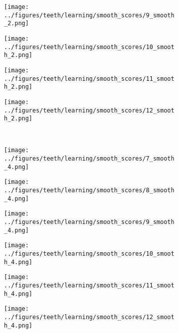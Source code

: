 \begin{figure}[h!]
	\begin{subfigure}{0.16\textwidth}
		\centering
		\texttt{[image: ../figures/teeth/learning/smooth\_scores/9\_smooth\_2.png]}
		\label{fig:1}
	\end{subfigure}
	\begin{subfigure}{0.16\textwidth}
		\centering
		\texttt{[image: ../figures/teeth/learning/smooth\_scores/10\_smooth\_2.png]}
		\label{fig:1}
	\end{subfigure}
	\begin{subfigure}{0.16\textwidth}
		\centering
		\texttt{[image: ../figures/teeth/learning/smooth\_scores/11\_smooth\_2.png]}
		\label{fig:1}
	\end{subfigure}
	\begin{subfigure}{0.16\textwidth}
		\centering
		\texttt{[image: ../figures/teeth/learning/smooth\_scores/12\_smooth\_2.png]}
		\label{fig:1}
	\end{subfigure}
	\vspace{-0.35cm}
	\\
	\begin{subfigure}{0.16\textwidth}
		\centering
		\texttt{[image: ../figures/teeth/learning/smooth\_scores/7\_smooth\_4.png]}
		\label{fig:1}
	\end{subfigure}
	\begin{subfigure}{0.16\textwidth}
		\centering
		\texttt{[image: ../figures/teeth/learning/smooth\_scores/8\_smooth\_4.png]}
		\label{fig:1}
	\end{subfigure}
	\begin{subfigure}{0.16\textwidth}
		\centering
		\texttt{[image: ../figures/teeth/learning/smooth\_scores/9\_smooth\_4.png]}
		\label{fig:1}
	\end{subfigure}
	\begin{subfigure}{0.16\textwidth}
		\centering
		\texttt{[image: ../figures/teeth/learning/smooth\_scores/10\_smooth\_4.png]}
		\label{fig:1}
	\end{subfigure}
	\begin{subfigure}{0.16\textwidth}
		\centering
		\texttt{[image: ../figures/teeth/learning/smooth\_scores/11\_smooth\_4.png]}
		\label{fig:1}
	\end{subfigure}
	\begin{subfigure}{0.16\textwidth}
		\centering
		\texttt{[image: ../figures/teeth/learning/smooth\_scores/12\_smooth\_4.png]}
		\label{fig:1}
	\end{subfigure}

\end{figure}
